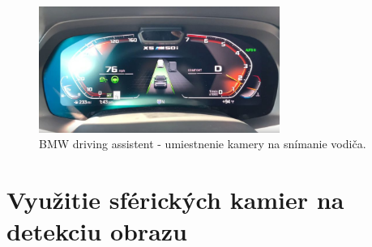 \documentclass[slovak,master,dept460,male,cpp,cpdeclaration]{diploma}
\begin{document}
\begin{figure}[H]
	\centering
	\includegraphics[width=0.7\textwidth]{Figures/bmw.jpg}
	\caption{BMW driving assistent - umiestnenie kamery na snímanie vodiča.\cite{bmw2019assistent}}
	\label{fig:bmwAssistent}
\end{figure}






\newpage
\section{Využitie sférických kamier na detekciu obrazu}
\label{sec:Spherical cameras}
\end{document}
